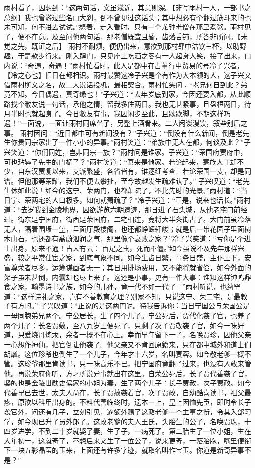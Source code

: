 \documentclass[12pt,oneside]{book}
\begin{document}
雨村看了，因想到：“这两句话，文虽浅近，其意则深。【非写雨村一人，一部书之总纲】我也曾游过些名山大刹，倒不曾见过这话头；其中想必有个翻过筋斗来的也未可知，何不进去试试。”想着，走入看时，只有一个龙钟老僧在那里煮粥。雨村见了，便不在意。及至问他两句话，那老僧既聋且昏，齿落舌钝，所答非所问。【未觉之先，既证之后】
雨村不耐烦，便仍出来，意欲到那村肆中沽饮三杯，以助野趣，于是款步行来。刚入肆门，只见座上吃酒之客有一人起身大笑，接了出来，口内说：“奇遇，奇遇！”雨村忙看时，此人是都中在古董行中贸易的号冷子兴者，【冷之心也】旧日在都相识。雨村最赞这冷子兴是个有作为大本领的人，这子兴又借雨村斯文之名，故二人说话投机，最相契合。雨村忙笑问：“老兄何日到此？弟竟不知。今日偶遇，真奇缘也！”子兴道：“去年岁底到家，今因还要入都，从此顺路找个敝友说一句话，承他之情，留我多住两日。我也无甚紧事，且盘桓两日，待月半时也就起身了。今日敝友有事，我因闲步至此，且歇歇脚，不期这样巧遇！”一面说，一面让雨村同席坐了，另整上酒肴来。二人闲谈漫饮，叙些别后之事。
雨村因问：“近日都中可有新闻没有？”子兴道：“倒没有什么新闻，倒是老先生你贵同宗家出了一件小小的异事。”雨村笑道：“弟族中无人在都，何谈及此？”子兴笑道：“你们同姓，岂非同宗一族？”雨村问是谁家。子兴道：“荣国府贾府中，可也玷辱了先生的门楣了？”雨村笑道：“原来是他家。若论起来，寒族人丁却不少，自东汉贾复以来，支派繁盛，各省皆有，谁逐细考查！若论荣国一支，却是同谱。但他那等荣耀，我们不便去攀扯，至今故越发生疏难认了。”
子兴叹道：“老先生休如此说！如今的这宁、荣两门，也都萧疏了，不比先时的光景。”雨村道：“当日宁、荣两宅的人口极多，如何就萧疏了？”冷子兴道：“正是，说来也话长。”雨村道：“去岁我到金陵地界，因欲游览六朝遗迹，那日进了石头城，从他老宅门前经过。街东是宁国府，街西是荣国府，二宅相连，竟将大半条街占了。大门前虽冷落无人，隔着围墙一望，里面厅殿楼阁，也还都峥嵘轩峻；就是后一带花园子里面树木山石，也还都有蓊蔚洇润之气，那里像个衰败之家？”冷子兴笑道：“亏你是个进士出身，原来不通！古人有云：‘百足之虫，死而不僵。’如今虽说不及先年那样兴盛，较之平常仕宦之家，到底气象不同。如今生齿日繁，事务日盛，主仆上下，安富尊荣者尽多，运筹谋画者无一；其日用排场费用，又不能将就省俭，如今外面的架子虽未甚倒，内囊却也尽上来了。这还是小事，更有一件大事：谁知这样钟鸣鼎食之家，翰墨诗书之族，如今的儿孙，竟一代不如一代了！”雨村听说，也纳罕道：“这样诗礼之家，岂有不善教育之理？别家不知，只说这宁、荣二宅，是最教子有方的。”
子兴叹道：“正说的是这两门呢。待我告诉你：当日宁国公与荣国公是一母同胞弟兄两个。宁公居长，生了四个儿子。宁公死后，贾代化袭了官，也养了两个儿子：长名贾敷，至八九岁上便死了，只剩了次子贾敬袭了官，如今一味好道，只爱烧丹炼汞，余者一概不在心上。幸而早年留下一子，名唤贾珍，因他父亲一心想作神仙，把官倒让他袭了。他父亲又不肯回原籍来，只在都中城外和道士们胡羼。这位珍爷也倒生了一个儿子，今年才十六岁，名叫贾蓉。如今敬老爹一概不管。这珍爷那里肯读书，只一味高乐不已，把宁国府竟翻了过来，也没有人敢来管他。再说荣府你听，方才所说异事就出在这里。自荣公死后，长子贾代善袭了官，娶的也是金陵世勋史侯家的小姐为妻，生了两个儿子：长子贾赦，次子贾政。如今代善早已去世，太夫人尚在，长子贾赦袭着官，次子贾政，自幼酷喜读书，祖父最疼，原欲以科甲出身的。不料代善临终时，遗本一上，皇上因恤先臣，即时令长子袭官外，问还有几子，立刻引见，遂额外赐了这政老爹一个主事之衔，令其入部习学，如今现已升了员外郎了。这政老爹的夫人王氏，头胎生的公子，名唤贾珠，十四岁进学，不到二十岁就娶了妻，生了子，一病死了。第二胎生了一位小姐，生在大年初一，这就奇了，不想后来又生了一位公子，说来更奇，一落胎胞，嘴里便衔下一块五彩晶莹的玉来，上面还有许多字迹，就取名叫作宝玉。你道是新奇异事不是？”
\end{document}
